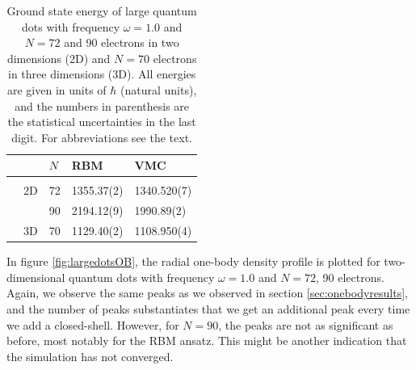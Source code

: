 \begin{table}
	\caption{Ground state energy of large quantum dots with frequency $\omega=1.0$ and $N=72$ and 90 electrons in two dimensions (2D) and $N=70$ electrons in three dimensions (3D). All energies are given in units of $\hbar$ (natural units), and the numbers in parenthesis are the statistical uncertainties in the last digit. For abbreviations see the text.}
	\label{tab:largeQD}
	\begin{tabularx}{\textwidth}{R{1.6cm}R{2cm}R{2cm}R{3cm}R{3cm}} \hline\hline
		& \makecell{\\ \phantom{$N$}} & $N$ & RBM & VMC \\ \hline \\
		& 2D & 72 & 1355.37(2) & 1340.520(7) \\
		&& 90 & 2194.12(9) & 1990.89(2) \\
		& 3D & 70 & 1129.40(2) & 1108.950(4) \\
		\hline \hline
	\end{tabularx}
\end{table}

In figure \eqref{fig:largedotsOB}, the radial one-body density profile is plotted for two-dimensional quantum dots with frequency $\omega=1.0$ and $N=72$, 90 electrons. Again, we observe the same peaks as we observed in section \ref{sec:onebodyresults}, and the number of peaks substantiates that we get an additional peak every time we add a closed-shell. However, for $N=90$, the peaks are not as significant as before, most notably for the RBM ansatz. This might be another indication that the simulation has not converged.

